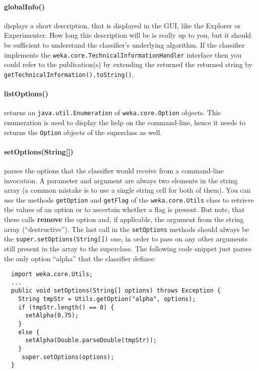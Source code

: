 \paragraph{globalInfo()} displays a short description, that is displayed in the
GUI, like the Explorer or Experimenter. How long this description will be is
really up to you, but it should be sufficient to understand the classifier's
underlying algorithm. If the classifier implements the
\texttt{weka.core.TechnicalInformationHandler} interface then you could refer
to the publication(s) by extending the returned the returned string by
\texttt{getTechnicalInformation().toString()}.

\newpage
\paragraph{listOptions()} returns an \texttt{java.util.Enumeration} of
\texttt{weka.core.Option} objects. This enumeration is used to display the help
on the command-line, hence it needs to returns the \texttt{Option} objects of
the superclass as well.

\paragraph{setOptions(String[])} parses the options that the classifier
would receive from a command-line invocation. A parameter and argument are
always two elements in the string array (a common mistake is to use a single
string cell for both of them). You can use the methods \texttt{getOption} and
\texttt{getFlag} of the \texttt{weka.core.Utils} class to retrieve the values
of an option or to ascertain whether a flag is present. But note, that these
calls \textbf{remove} the option and, if applicable, the argument from the
string array (``destructive''). The last call in the \texttt{setOptions}
methods should always be the \texttt{super.setOptions(String[])} one, in order
to pass on any other arguments still present in the array to the superclass.
The following code snippet just parses the only option ``alpha'' that the
classifier defines:
\begin{verbatim}
  import weka.core.Utils;
  ...
  public void setOptions(String[] options) throws Exception {
    String tmpStr = Utils.getOption("alpha", options);
    if (tmpStr.length() == 0) {
      setAlpha(0.75);
    }
    else {
      setAlpha(Double.parseDouble(tmpStr));
    }
     super.setOptions(options);
  }
\end{verbatim}

